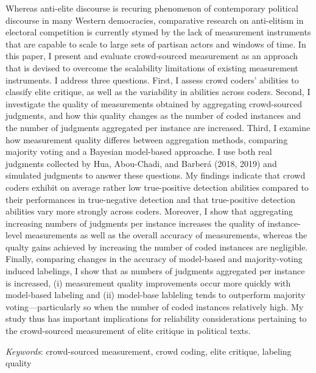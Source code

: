 \documentclass[12pt,]{article}
\renewenvironment{abstract}
{{%
  \setlength{\leftmargin}{0mm}
  \setlength{\rightmargin}{\leftmargin}%
}%
  \relax}
{\endlist}
\begin{document}
\begin{abstract}

\hbox{\vrule height .2pt width 39.14pc}

\vskip 8.5pt %

\noindent Whereas anti-elite discourse is recuring phenomenon of contemporary
political discourse in many Western democracies, comparative research on
anti-elitism in electoral competition is currently stymed by the lack of
measurement instruments that are capable to scale to large sets of
partisan actors and windows of time. In this paper, I present and
evaluate crowd-sourced measurement as an approach that is devised to
overcome the scalability limitations of existing measurement
instruments. I address three questions. First, I assess crowd coders'
abilities to classify elite critique, as well as the variability in
abilities across coders. Second, I investigate the quality of
measurements obtained by aggregating crowd-sourced judgments, and how
this quality changes as the number of coded instances and the number of
judgments aggregated per instance are increased. Third, I examine how
measurement quality differes between aggregation methods, comparing
majority voting and a Bayesian model-based approache. I use both real
judgments collected by Hua, Abou-Chadi, and Barberá (2018, 2019) and
simulated judgments to answer these questions. My findings indicate that
crowd coders exhibit on average rather low true-positive detection
abilities compared to their performances in true-negative detection and
that true-positive detection abilities vary more strongly across coders.
Moreover, I show that aggregating increasing numbers of judgments per
instance increases the quality of instance-level measurements as well as
the overall accuracy of measurements, whereas the qualty gains achieved
by increasing the number of coded instances are negligible. Finally,
comparing changes in the accuracy of model-based and majority-voting
induced labelings, I show that as numbers of judgments aggregated per
instance is increased, (i) measurement quality improvements occur more
quickly with model-based labeling and (ii) model-base lableling tends to
outperform majority voting---particularly so when the number of coded
instances relatively high. My study thus has important implications for
reliability considerations pertaining to the crowd-sourced measurement
of elite critique in political texts.


\vskip 8.5pt \noindent \emph{Keywords}: crowd-sourced measurement, crowd coding, elite critique, labeling
quality \par

\hbox{\vrule height .2pt width 39.14pc}



\end{abstract}
\end{document}
